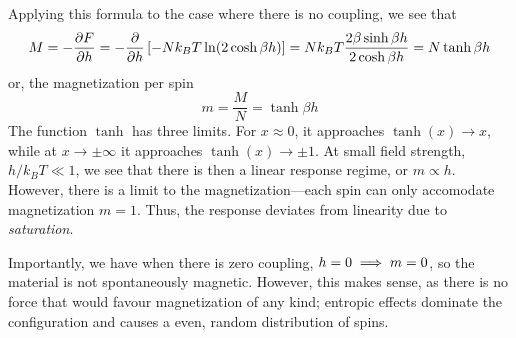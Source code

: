 Applying this formula to the case where there is no coupling, we see that 
\[M = -\frac{\partial F}{\partial h} = -\frac{\partial }{\partial h}\left[-Nk_BT\ln (2\cosh \beta h)\right] = Nk_BT\frac{2\beta\sinh\beta h}{2\cosh\beta h} = N\tanh\beta h\]
or, the magnetization per spin
\[m = \frac{M}{N} = \tanh \beta h\]
The function \(\tanh\) has three limits. For \(x\approx 0\), it approaches \(\tanh(x)\to x\), while at \(x\to \pm \infty\) it approaches \(\tanh(x)\to\pm 1\). At small field strength, \(h/k_BT\ll1\), we see that there is then a linear response regime, or \(m\propto h\). However, there is a limit to the magnetization---each spin can only accomodate magnetization \(m=1\). Thus, the response deviates from linearity due to \emph{saturation}.

Importantly, we have when there is zero coupling, \(h=0\implies m=0\), so the material is not spontaneously magnetic. However, this makes sense, as there is no force that would favour magnetization of any kind; entropic effects dominate the configuration and causes a even, random distribution of spins.

